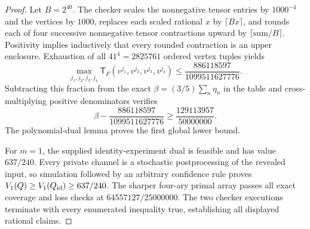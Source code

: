 \documentclass{article}
\begin{document}
\begin{proof}
Let \(B=2^{40}\).  The checker scales the nonnegative tensor entries by \(1000^{-4}\) and the vertices by \(1000\), replaces each scaled rational \(x\) by \(\lceil Bx\rceil\), and rounds each of four successive nonnegative tensor contractions upward by \(\lceil\text{sum}/B\rceil\).  Positivity implies inductively that every rounded contraction is an upper enclosure.  Exhaustion of all \(41^4=2825761\) ordered vertex tuples yields
\[
 \max_{j_1,j_2,j_3,j_4}\mathsf T_F(v^{j_1},v^{j_2},v^{j_3},v^{j_4})
 \le\frac{886118597}{1099511627776}.
\]
Subtracting this fraction from the exact \(\beta=(3/5)\sum_n\eta_n\) in the table and cross-multiplying positive denominators verifies
\[
 \beta-\frac{886118597}{1099511627776}
 \ge\frac{129113957}{50000000}.
\]
The polynomial-dual lemma proves the first global lower bound.

For \(m=1\), the supplied identity-experiment dual is feasible and has value \(637/240\).  Every private channel is a stochastic postprocessing of the revealed input, so simulation followed by an arbitrary confidence rule proves \(V_1(Q)\ge V_1(Q_{\rm id})\ge637/240\).  The sharper four-ary primal array passes all exact coverage and loss checks at \(64557127/25000000\).  The two checker executions terminate with every enumerated inequality true, establishing all displayed rational claims.
\end{proof}
\end{document}
